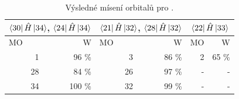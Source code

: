 \documentclass[
  printed, %
  table,   %
  lof,     %
  lot,     %
  oneside,
]{fithesis3}
\begin{document}
  \begin{table}[htbp]
\caption{Výsledné mísení orbitalů pro .}
\begin{center}
\begin{tabular}{|r|r|r|r|r|r|}
\hline
\multicolumn{2}{|c}{$\bra{30}{\hat{H}}\ket{34}$, $\bra{24}{\hat{H}}\ket{34}$} & \multicolumn{2}{|c|}{$\bra{21}{\hat{H}}\ket{32}$, $\bra{28}{\hat{H}}\ket{32}$}& \multicolumn{2}{|c|}{$\bra{22}{\hat{H}}\ket{33}$} \\
\hline \hline
\multicolumn{1}{|l|}{MO} & \multicolumn{1}{r|}{W} & \multicolumn{1}{l|}{MO} & \multicolumn{1}{r|}{W} & MO & \multicolumn{1}{r|}{W} \\ \hline
1 & 96 \% & 3 & 86 \% &2 & 65 \% \\ \hline
28 & 84 \% & 26 & 97 \% & - & - \\ \hline
34 & 100 \% & 32 & 99 \% &  -& - \\ \hline
\end{tabular}
\label{tab_h6sio6_vysledky}\end{center}
\end{table}
     
\end{document}
